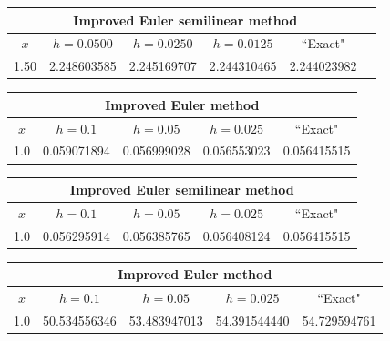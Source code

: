 \bigskip

\hspace{.75in}
{\small
\begin{tabular}{|c|r|r|r|r|r|}
\hline
\multicolumn{5}{|c|}{
Improved Euler semilinear method}\\\hline
\multicolumn{1}{|c|}{$x$}&
\multicolumn{1}{|c|}{$h=0.0500$}&
\multicolumn{1}{|c|}{$h=0.0250$}&
\multicolumn{1}{|c|}{$h=0.0125$}&
\multicolumn{1}{|c|}{``Exact"}\\ \hline
1.50 & 2.248603585 & 2.245169707 & 2.244310465 & 2.244023982 \\
\hline
\end{tabular}}

\bigskip

{\small
\begin{tabular}{|c|r|r|r|r|}
\hline
\multicolumn{5}{|c|}{Improved Euler method}\\\hline
\multicolumn{1}{|c|}{$x$}&
\multicolumn{1}{|c|}{$h=0.1$}&
\multicolumn{1}{|c|}{$h=0.05$}&
\multicolumn{1}{|c|}{$h=0.025$}&
\multicolumn{1}{|c|}{``Exact"}\\ \hline
1.0 & 0.059071894 & 0.056999028 & 0.056553023 & 0.056415515 \\
\hline
\end{tabular}}
\medskip

\bigskip

\hspace{.75in}
{\small
\begin{tabular}{|c|r|r|r|r|}
\hline
\multicolumn{5}{|c|}{Improved Euler semilinear method}\\\hline
\multicolumn{1}{|c|}{$x$}&
\multicolumn{1}{|c|}{$h=0.1$}&
\multicolumn{1}{|c|}{$h=0.05$}&
\multicolumn{1}{|c|}{$h=0.025$}&
\multicolumn{1}{|c|}{``Exact"}\\ \hline
1.0 & 0.056295914 & 0.056385765 & 0.056408124 & 0.056415515 \\
\hline
\end{tabular}}

\bigskip

{\small
\begin{tabular}{|c|r|r|r|r|}
\hline
\multicolumn{5}{|c|}{Improved Euler method}\\\hline
\multicolumn{1}{|c|}{$x$}&
\multicolumn{1}{|c|}{$h=0.1$}&
\multicolumn{1}{|c|}{$h=0.05$}&
\multicolumn{1}{|c|}{$h=0.025$}&
\multicolumn{1}{|c|}{``Exact"}\\ \hline
1.0 & 50.534556346 & 53.483947013 & 54.391544440 & 54.729594761 \\
\hline
\end{tabular}}
\medskip

